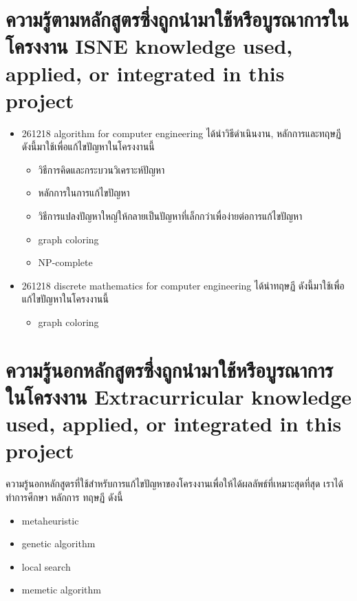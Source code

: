 \section{\ifcpe%
ความรู้ตามหลักสูตรซึ่งถูกนำมาใช้หรือบูรณาการในโครงงาน
\else%
ISNE knowledge used, applied, or integrated in this project
\fi
}
\begin{itemize}
  \item 261218 algorithm for computer engineering ได้นำวิธีดำเนินงาน, หลักการและทฤษฏี ดังนี้มาใช้เพื่อแก้ไขปัญหาในโครงงานนี้  
  \begin{itemize}
  \item วิธีการคิดและกระบวนวิเคราะห์ปัญหา
  \item หลักการในการแก้ไขปัญหา
  \item วิธีการแปลงปัญหาใหญ่ให้กลายเป็นปัญหาที่เล็กกว่าเพื่อง่ายต่อการแก้ไขปัญหา
  \item graph coloring
  \item NP-complete
  \end{itemize}

\item 261218 discrete mathematics for computer engineering  ได้นำทฤษฏี ดังนี้มาใช้เพื่อแก้ไขปัญหาในโครงงานนี้
  \begin{itemize}
  \item graph coloring
  \end{itemize}
\end{itemize}

\section{\ifcpe%
ความรู้นอกหลักสูตรซึ่งถูกนำมาใช้หรือบูรณาการในโครงงาน
\else%
Extracurricular knowledge used, applied, or integrated in this project
\fi
}
ความรู้นอกหลักสูตรที่ใช้สำหรับการแก้ไขปัญหาของโครงงานเพื่อให้ได้ผลลัพธ์ที่เหมาะสุดที่สุด เราได้ทำการศึกษา หลักการ ทฤษฏี ดังนี้
\begin{itemize}
  \item meta­heuristic 
  \item genetic algorithm
  \item local search
  \item memetic algorithm
\end{itemize}
